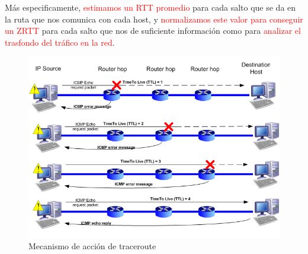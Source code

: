 Más especificamente, \textcolor{red}{estimamos un RTT promedio} para cada salto que se da en
la ruta que nos comunica con cada host, y \textcolor{red}{normalizamos este valor para
conseguir un ZRTT} para cada salto que nos de suficiente informaci\'on como para
\textcolor{red}{analizar el trasfondo del tr\'afico en la red}.

\begin{figure}[!h]
  \begin{center}
      \includegraphics[scale=0.4]{imagenes/traceroute.png}
      \caption{Mecanismo de acción de traceroute}
      \label{fig:contra1}
  \end{center}
\end{figure}
